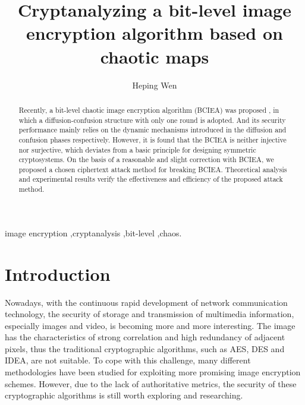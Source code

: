 \documentclass[final,3p,times,twocolumn]{elsarticle}
\begin{document}
\begin{frontmatter}

\title{Cryptanalyzing a bit-level image encryption algorithm based on chaotic maps}

\author[zsi,uestc]{Heping Wen}




\address[zsi]{School of Electronic and Information Engineering, University of Electronic Science and Technology of China, Zhongshan Institute, \\ Zhongshan 528402, China}

\address[uestc]{School of Information and Communication Engineering, University of Electronic Science and Technology of China, Chengdu 611731, China}

\begin{abstract}

Recently, a bit-level chaotic image encryption algorithm (BCIEA) was proposed \cite{LuX2016OLE}, in which a diffusion-confusion structure with only one round is adopted. 
And its security performance mainly relies on the dynamic mechanisms introduced in the diffusion and confusion phases respectively.
However, it is found that the BCIEA is neither injective  nor surjective, which deviates from a basic principle for designing symmetric cryptosystems.
On the basis of a reasonable and slight correction with BCIEA, we proposed a chosen ciphertext attack method for breaking BCIEA.
Theoretical analysis and experimental results verify the effectiveness and efficiency of the proposed attack method.


\end{abstract}
\begin{keyword}
image encryption \sep cryptanalysis \sep bit-level \sep chaos.
\end{keyword}
\end{frontmatter}

\section{Introduction}
\label{sec:intro}

Nowadays, with the continuous rapid development of network communication technology, the security of storage and transmission of multimedia information, especially images and video, is becoming more and more interesting.
The image has the characteristics of strong correlation and high redundancy of adjacent pixels, thus the traditional cryptographic algorithms, such as AES, DES and IDEA, are not suitable.
To cope with this challenge, many different methodologies have been studied for exploiting more promising image encryption schemes. 
However, due to the lack of authoritative metrics, the security of these cryptographic algorithms is still worth exploring and researching.
\end{document}
